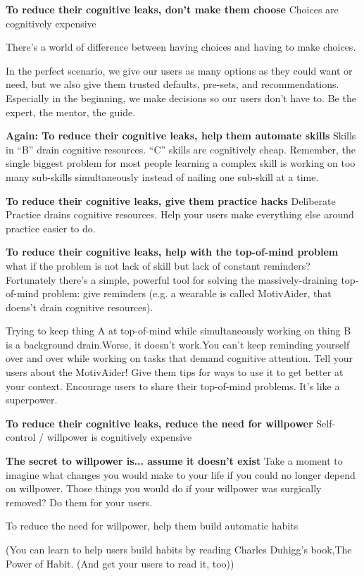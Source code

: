 \textbf{To reduce their cognitive leaks, don’t make them choose}
Choices are cognitively expensive

There’s a world of difference between having choices and having to make choices.

In the perfect scenario, we give our users as many options as they could want or need, but we also give them trusted defaults, pre-sets, and recommendations. Especially in the beginning, we make decisions so our users don’t have to.
Be the expert, the mentor, the guide.

\textbf{Again: To reduce their cognitive leaks, help them automate skills}
Skills in “B” drain cognitive resources. “C” skills are cognitively cheap.
Remember, the single biggest problem for most people learning a complex skill is working on too many sub-skills simultaneously instead of nailing one sub-skill at a time.

\textbf{To reduce their cognitive leaks, give them practice hacks}
Deliberate Practice drains cognitive resources. Help your users make everything else around practice easier to do.

\textbf{To reduce their cognitive leaks, help with the top-of-mind problem}
what if the problem
is not lack of skill but lack of constant reminders? Fortunately there’s a simple, powerful tool for solving the massively-draining top-of-mind problem: give reminders (e.g. a wearable is called MotivAider, that doens't drain cognitive resources).

Trying to keep thing A at top-of-mind while simultaneously working on thing B is a background drain.Worse, it doesn’t work.You can’t keep reminding yourself over and over while working on tasks that demand cognitive attention.
Tell your users about the MotivAider! Give them tips for ways to use it to get better at your context. Encourage users to share their top-of-mind problems. It’s like a superpower.

\textbf{To reduce their cognitive leaks, reduce the need for willpower}
Self-control / willpower is cognitively expensive

\textbf{The secret to willpower is... assume it doesn’t exist}
Take a moment to imagine what changes you would make to your life if you could no longer depend on willpower.
Those things you would do if your willpower was surgically removed?
Do them for your users.

To reduce the need for willpower, help them build automatic habits

(You can learn to help users build habits by reading Charles Duhigg’s book,The Power of Habit.
(And get your users to read it, too))

